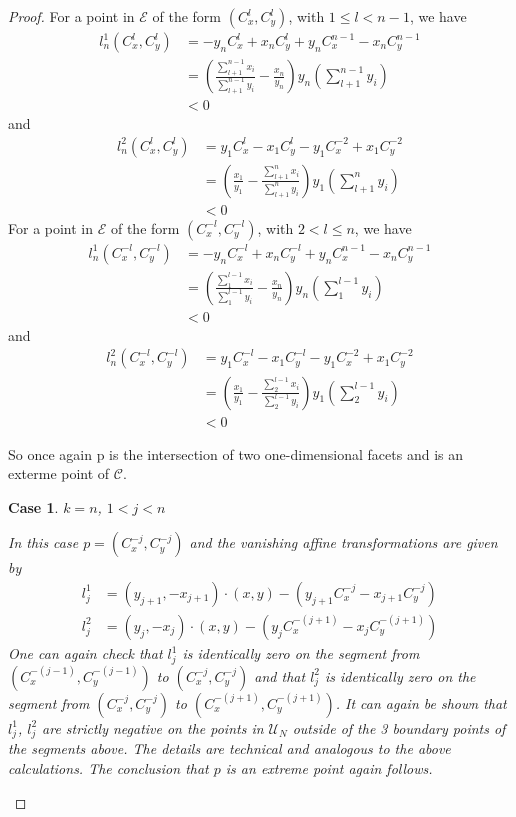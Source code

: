 \documentclass{article}
\theoremstyle{case}
\newtheorem{case}{Case}
\begin{document}
\begin{proof}
For a point in $\mathcal{E}$ of the form $\left( C_x^l, C_y^l\right)$, with $1 \leq l < n-1$, we have
\begin{align*}
l_n^1\left( C_x^l, C_y^l\right) &= -y_nC_x^l + x_nC_y^l + y_nC_x^{n-1} - x_nC_y^{n-1} \\
&= \left( \frac{\sum_{l+1}^{n-1}x_i}{\sum_{l+1}^{n-1}y_i} - \frac{x_n}{y_n}\right) y_n\left( \sum_{l+1}^{n-1}y_i\right) \\
&< 0
\end{align*}
and
\begin{align*}
l_n^2\left( C_x^l, C_y^l\right) &= y_1C_x^l - x_1C_y^l - y_1C_x^{-2} + x_1C_y^{-2} \\
&= \left( \frac{x_1}{y_1} - \frac{\sum_{l+1}^n x_i}{\sum_{l+1}^n y_i}\right)y_1\left( \sum_{l+1}^n y_i\right) \\
&< 0
\end{align*}
For a point in $\mathcal{E}$ of the form $\left(C_x^{-l},C_y^{-l}\right)$, with $2 < l \leq n$, we have
\begin{align*}
l_n^1\left( C_x^{-l},C_y^{-l}\right) &= -y_nC_x^{-l} + x_nC_y^{-l} + y_nC_x^{n-1} - x_nC_y^{n-1} \\
&= \left( \frac{\sum_1^{l-1}x_i}{\sum_1^{l-1}y_i} - \frac{x_n}{y_n}\right) y_n\left( \sum_1^{l-1}y_i\right) \\
&< 0
\end{align*}
and
\begin{align*}
l_n^2\left( C_x^{-l},C_y^{-l}\right) &= y_1C_x^{-l} -x_1C_y^{-l} - y_1C_x^{-2} + x_1C_y^{-2} \\
&= \left( \frac{x_1}{y_1} - \frac{\sum_2^{l-1}x_i}{\sum_2^{l-1}y_i}\right)y_1\left( \sum_2^{l-1}y_i\right) \\
&< 0
\end{align*}

So once again p is the intersection of two one-dimensional facets and is an exterme point of $\mathcal{C}$.

\begin{case} $k = n$, $1 < j < n$

In this case $p = \left( C_x^{-j}, C_y^{-j}\right)$ and the vanishing affine transformations are given by
\begin{align*}
l_j^1 &= \left( y_{j+1}, -x_{j+1}\right) \cdot \left( x,y\right) - \left( y_{j+1}C_x^{-j} - x_{j+1}C_y^{-j}\right) \\
l_j^2 &= \left( y_j, -x_j\right) \cdot \left( x,y\right) - \left( y_jC_x^{-\left(j+1\right)} - x_jC_y^{-\left( j+1\right)}\right)
\end{align*}
One can again check that $l_j^1$ is identically zero on the segment from $\left( C_x^{-(j-1)}, C_y^{-(j-1)}\right)$ to $\left( C_x^{-j}, C_y^{-j}\right)$ and that $l_j^2$ is identically zero on the segment from  $\left( C_x^{-j}, C_y^{-j}\right)$ to $\left( C_x^{-(j+1)}, C_y^{-(j+1)}\right)$. It can again be shown that $l_j^1$, $l_j^2$ are strictly negative on the points in $\mathcal{U}_N$ outside of the 3 boundary points of the segments above. The details are technical and analogous to the above calculations. The conclusion that $p$ is an extreme point again follows.
\end{case} 


\end{proof}
\end{document}
